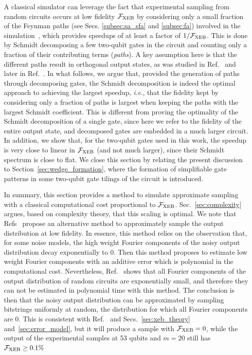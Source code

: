 A classical simulator can leverage the fact that experimental sampling from random circuits occurs at low fidelity $\mathcal{F}_{\text{XEB}}$ by considering only a small fraction of the Feynman paths (see Secs. \ref{subsec:sa_sfa} and \ref{subsec:fa}) involved in the simulation~\cite{markov_quantum_2018}, which provides speedups of at least a factor of $1/\mathcal{F}_{\text{XEB}}$. This is done by Schmidt decomposing a few two-qubit gates in the circuit and counting only a fraction of their contributing terms (\emph{paths}). A key assumption here is that the different paths result in orthogonal output states, as was studied in Ref.~\cite{markov_quantum_2018} and later in Ref.~\cite{villalonga2019flexible}. In what follows, we argue that, provided the generation of paths through decomposing gates, the Schmidt decomposition is indeed the optimal approach to achieving the largest speedup, \emph{i.e.}, that the fidelity kept by considering only a fraction of paths is largest when keeping the paths with the largest Schmidt coefficient. This is different from proving the optimality of the Schmidt decomposition of a single gate, since here we refer to the fidelity of the entire output state, and decomposed gates are embedded in a much larger circuit. In addition, we show that, for the two-qubit gates used in this work, the speedup is very close to linear in $\mathcal{F}_{\text{XEB}}$ (and not much larger), since their Schmidt spectrum is close to flat. We close this section by relating the present discussion to Section~\ref{sec:wedge_formation}, where the formation of simplifiable gate patterns in some two-qubit gate tilings of the circuit is introduced.

In summary, this section provides a method to simulate approximate sampling with a classical computational cost proportional to $\mathcal{F}_{\text{XEB}}$. Sec.~\ref{sec:complexity} argues, based on complexity theory, that this scaling is optimal. We note that Refs~\cite{kalai2014gaussian,bremner2017achieving,yung2017can} propose an alternative method to approximately sample the output distribution at low fidelity. In essence, this method relies on the observation that, for some noise models, the high weight Fourier components of the noisy output distribution decay exponentially to 0. Then this method proposes to estimate low weight Fourier components with an additive error which is polynomial in the computational cost. Nevertheless, Ref.~\cite{boixo2017fourier} shows that all Fourier components of the output distribution of random circuits are exponentially small, and therefore they can not be estimated in polynomial time with this method. The conclusion is then that the noisy output distribution can be approximated by sampling bitstrings uniformly at random, the distribution for which all Fourier components are 0. This is consistent with Ref.~\cite{boixo2018characterizing} and Secs.~\ref{sec:xeb_theory} and~\ref{sec:error_model}, but it will produce a sample with $\mathcal{F}_{\text{XEB}} =0$, while the output of the experimental samples at 53 qubits and $m=20$ still has $\mathcal{F}_{\text{XEB}} \ge 0.1\%$


